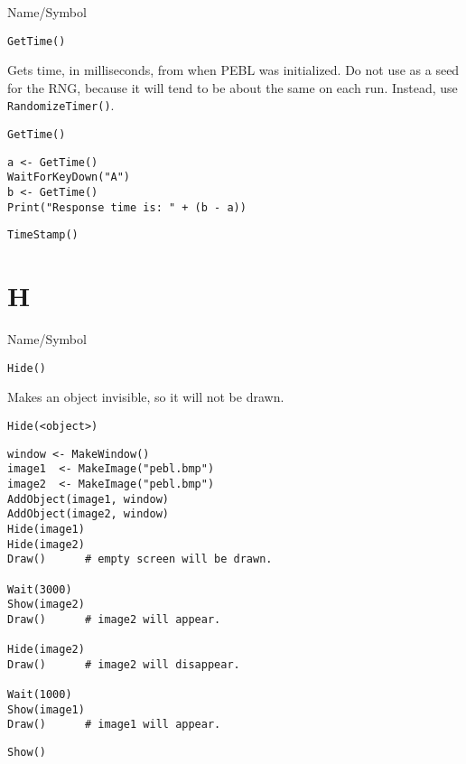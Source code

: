 \begin{desc}{Name/Symbol}
\item[Name/Symbol]	\verb+GetTime()+

\item[Description] Gets time, in milliseconds, from when PEBL was
  initialized.  Do not use as a seed for the RNG, because it will tend
  to be about the same on each run. Instead, use \verb+RandomizeTimer()+.

\item[Usage]
\begin{verbatim}
GetTime()
\end{verbatim}

\item[Example]
\begin{verbatim}
a <- GetTime()
WaitForKeyDown("A")
b <- GetTime()
Print("Response time is: " + (b - a))
\end{verbatim}

\item[See Also]	\verb+TimeStamp()+
\end{desc}

\rl

\section{H}
\rl



\begin{desc}{Name/Symbol}
\item[Name/Symbol]	\verb+Hide()+ 

\item[Description]	Makes an object invisible, so it will not be drawn.

\item[Usage]
\begin{verbatim}
Hide(<object>)
\end{verbatim}

\item[Example]
\begin{verbatim}
window <- MakeWindow()
image1  <- MakeImage("pebl.bmp")
image2  <- MakeImage("pebl.bmp")
AddObject(image1, window)
AddObject(image2, window)
Hide(image1)
Hide(image2)
Draw()		# empty screen will be drawn.
	
Wait(3000)
Show(image2)
Draw()		# image2 will appear.

Hide(image2)
Draw()		# image2 will disappear.

Wait(1000)
Show(image1)
Draw()		# image1 will appear.
\end{verbatim}
 
\item[See Also]	\verb+Show()+
\end{desc}

